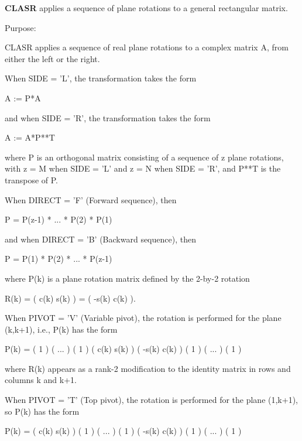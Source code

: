 {\bfseries C\+L\+A\+S\+R} applies a sequence of plane rotations to a general rectangular matrix. 

 \begin{DoxyParagraph}{Purpose\+: }
\begin{DoxyVerb} CLASR applies a sequence of real plane rotations to a complex matrix
 A, from either the left or the right.

 When SIDE = 'L', the transformation takes the form

    A := P*A

 and when SIDE = 'R', the transformation takes the form

    A := A*P**T

 where P is an orthogonal matrix consisting of a sequence of z plane
 rotations, with z = M when SIDE = 'L' and z = N when SIDE = 'R',
 and P**T is the transpose of P.
 
 When DIRECT = 'F' (Forward sequence), then
 
    P = P(z-1) * ... * P(2) * P(1)
 
 and when DIRECT = 'B' (Backward sequence), then
 
    P = P(1) * P(2) * ... * P(z-1)
 
 where P(k) is a plane rotation matrix defined by the 2-by-2 rotation
 
    R(k) = (  c(k)  s(k) )
         = ( -s(k)  c(k) ).
 
 When PIVOT = 'V' (Variable pivot), the rotation is performed
 for the plane (k,k+1), i.e., P(k) has the form
 
    P(k) = (  1                                            )
           (       ...                                     )
           (              1                                )
           (                   c(k)  s(k)                  )
           (                  -s(k)  c(k)                  )
           (                                1              )
           (                                     ...       )
           (                                            1  )
 
 where R(k) appears as a rank-2 modification to the identity matrix in
 rows and columns k and k+1.
 
 When PIVOT = 'T' (Top pivot), the rotation is performed for the
 plane (1,k+1), so P(k) has the form
 
    P(k) = (  c(k)                    s(k)                 )
           (         1                                     )
           (              ...                              )
           (                     1                         )
           ( -s(k)                    c(k)                 )
           (                                 1             )
           (                                      ...      )
           (                                             1 )
 

\end{DoxyVerb}
\end{DoxyParagraph}
